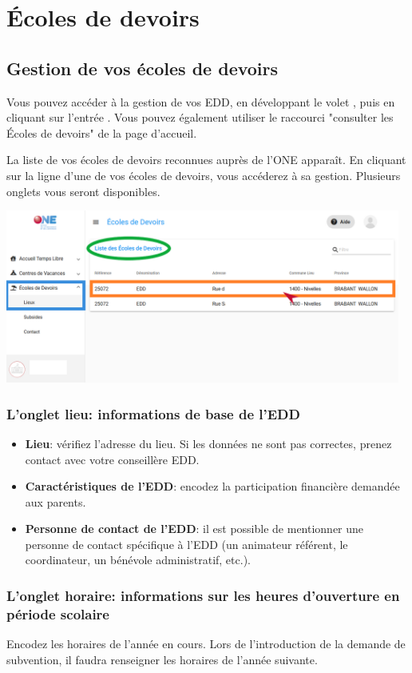 \chapter{Écoles de devoirs}
\section{Gestion de vos écoles de devoirs}
Vous pouvez accéder à la gestion de vos EDD, en développant le volet , puis en cliquant sur l'entrée . Vous pouvez également utiliser le raccourci "consulter les Écoles de devoirs" de la page d'accueil.

La liste de vos écoles de devoirs reconnues auprès de l'ONE apparaît. En cliquant sur la ligne d'une de vos écoles de devoirs, vous accéderez à sa gestion. Plusieurs onglets vous seront disponibles. 
\vspace{1cm}

\centerline{\includegraphics[width=13cm]{Images/edd/edd-lieu.png}}


\subsection{L'onglet lieu: informations de base de l'EDD}
\begin{itemize}
    \item \textbf{Lieu}: vérifiez l'adresse du lieu. Si les données ne sont pas correctes, prenez contact avec votre conseillère EDD. 
    \item \textbf{Caractéristiques de l'EDD}: encodez la participation financière demandée aux parents.
    \item \textbf{Personne de contact de l'EDD}: il est possible de mentionner une personne de contact spécifique à l'EDD (un animateur référent, le coordinateur,  un bénévole administratif, etc.).
\end{itemize}

\subsection{L'onglet horaire: informations sur les heures d'ouverture en période scolaire}    
Encodez les horaires de l'année en cours. Lors de l'introduction de la demande de subvention, il faudra renseigner les horaires de l'année suivante.

